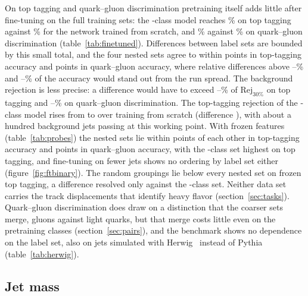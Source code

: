 On top tagging and quark--gluon discrimination pretraining itself adds little after fine-tuning on the full training
sets: the \Kfull-class model reaches \VFtTopAccFull\% on top tagging against \VFtTopAccScratch\% for the network
trained from scratch, and \VFtQgAccFull\% against \VFtQgAccScratch\% on quark--gluon discrimination
(table~\ref{tab:finetuned}).
Differences between label sets are bounded by this small total, and the four nested sets agree to within
\VFtTopAccRange{} points in top-tagging accuracy and \VFtQgAccRange{} points in quark--gluon accuracy, where relative
differences above \RevReachTopFtAccLo--\RevReachTopFtAccHi\% and \RevReachQgFtAccLo--\RevReachQgFtAccHi\% of the
accuracy would stand out from the run spread.
The background rejection is less precise: a difference would have to exceed
\RevReachTopFtRthirtyLo--\RevReachTopFtRthirtyHi\% of $\mathrm{Rej}_{30\%}$ on top tagging and
\RevReachQgFtRthirtyLo--\RevReachQgFtRthirtyHi\% on quark--gluon discrimination.
The top-tagging rejection of the \Kfull-class model rises from \VFtTopRejScratch{} to \VFtTopRejFull{} over training
from scratch (difference \RevDFtTopRejGain), with about a hundred background jets passing at this working point.
With frozen features (table~\ref{tab:probes}) the nested sets lie within \RevSpreadTopLpAccPts{} points of each other in
top-tagging accuracy and \RevSpreadQgLpAccPts{} points in quark--gluon accuracy, with the \Kcoarse-class set highest on
top tagging, and fine-tuning on fewer jets shows no ordering by label set either (figure~\ref{fig:ftbinary}).
The random groupings lie below every nested set on frozen top tagging, a difference resolved only against the
\Kcoarse-class set.
Neither data set carries the track displacements that identify heavy flavor (section~\ref{sec:tasks}).
Quark--gluon discrimination does draw on a distinction that the coarser sets merge, gluons against light quarks, but that
merge costs little even on the pretraining classes (section~\ref{sec:pairs}), and the benchmark shows no dependence on
the label set, also on jets simulated with Herwig~\cite{herwigsevenone} instead of Pythia~\cite{pythia}
(table~\ref{tab:herwig}).

\subsection{Jet mass}\label{sec:mass}

